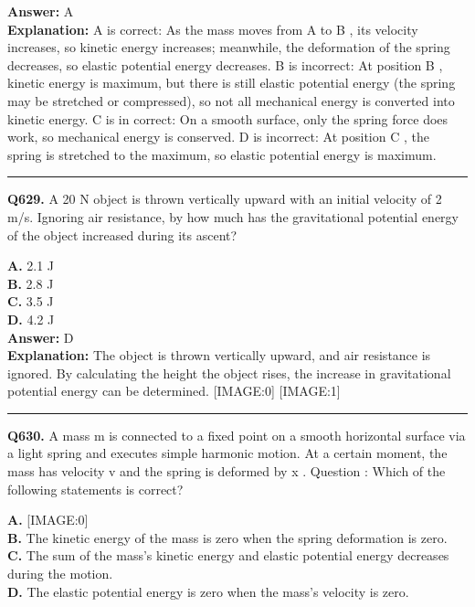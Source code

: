 \documentclass[12pt]{article}
\begin{document}
\textbf{Answer:} A \\
\textbf{Explanation:} A is correct: As the mass moves from
A
to
B
, its velocity increases, so kinetic energy increases; meanwhile, the deformation of the spring decreases, so elastic potential energy decreases.
B is incorrect: At position
B
, kinetic energy is maximum, but there is still elastic potential energy (the spring may be stretched or compressed), so not all mechanical energy is converted into kinetic energy.
C is
in
correct: On a smooth surface, only the spring force does work, so mechanical energy is conserved.
D is incorrect: At position
C
, the spring is stretched to the maximum, so elastic potential energy is maximum.

\hrule
\vspace{1em}


\noindent
\textbf{Q629.} A 20 N object is thrown vertically upward with an initial velocity of 2 m/s. Ignoring air resistance, by how much has the gravitational potential energy of the object increased during its ascent?



\textbf{A.} 2.1 J \\
\textbf{B.} 2.8 J \\
\textbf{C.} 3.5 J \\
\textbf{D.} 4.2 J \\

\textbf{Answer:} D \\
\textbf{Explanation:} The object is thrown vertically upward, and air resistance is ignored. By calculating the height the object rises, the increase in gravitational potential energy can be determined.
[IMAGE:0]
[IMAGE:1]

\hrule
\vspace{1em}


\noindent
\textbf{Q630.} A mass
m
is connected to a fixed point on a smooth horizontal surface via a light spring and executes simple harmonic motion. At a certain moment, the mass has velocity
v
and the spring is deformed by
x
.
Question
: Which of the following statements is correct?



\textbf{A.} [IMAGE:0] \\
\textbf{B.} The kinetic energy of the mass is zero when the spring deformation is zero. \\
\textbf{C.} The sum of the mass's kinetic energy and elastic potential energy decreases
during the motion. \\
\textbf{D.} The elastic potential energy is zero when the mass's velocity is zero. \\
\end{document}
